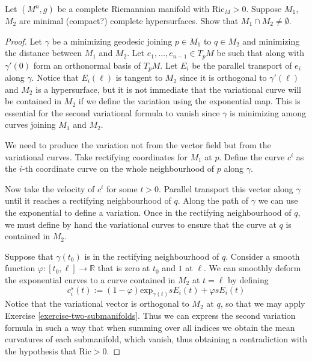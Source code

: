 \begin{exercise}
\label{exercise-inter-minim-hyper}
Let $(M^n,g)$ be a complete Riemannian
manifold with $\text{Ric}_M>0$.
Suppose $M_1$, $M_2$ are minimal (compact?)
complete hypersurfaces. Show that
$M_1 \cap M_2 \neq \emptyset$.
\end{exercise}

\begin{proof}
Let $\gamma$ be a minimizing geodesic joining
$p \in M_1$ to $q\in M_2$ and
minimizing the distance between $M_1$ and
$M_2$. Let $e_1,\ldots,e_{n-1}\in
T_pM$ be such that along with $\gamma'(0)$
form an orthonormal basis of $T_pM$.
Let $E_i$ be the parallel transport of $e_i$
along $\gamma$. Notice that
$E_i(\ell)$ is tangent to $M_2$ since it is
orthogonal to $\gamma'(\ell)$ and
$M_2$ is a hypersurface, but it is not
immediate that the variational curve will
be contained in $M_2$ if we define the
variation using the exponential map. This
is essential for the second variational
formula to vanish since $\gamma$ is
minimizing among curves joining $M_1$ and
$M_2$.

We need to produce the variation not from the
vector field but from the
variational curves. Take rectifying
coordinates for $M_1$ at $p$. Define the
curve $c^i$ as the $i$-th coordinate curve on
the whole neighbourhood of $p$
along $\gamma$.

Now take the velocity of $c^i$ for some
$t>0$. Parallel transport this vector
along $\gamma$ until it reaches a rectifying
neighbourhood of $q$. Along the
path of $\gamma$ we can use the exponential
to define a variation. Once in the
rectifying neighbourhood of $q$, we must
define by hand the variational curves
to ensure that the curve at $q$ is contained
in $M_2$.

Suppose that $\gamma(t_0)$ is in the
rectifying neighbourhood of $q$. Consider a
smooth function $\varphi:[t_0,\ell]\to
\mathbb{R}$ that is zero at $t_0$ and $1$
at $\ell$. We can smoothly deform the
exponential curves to a curve contained in
$M_2$ at $t=\ell$ by defining
$$
c^s_i(t):=(1-\varphi)\text{exp}_{\gamma(t)}
sE_i(t)+\varphi
sE_i(t)
$$
Notice that the variational vector is
orthogonal to $M_2$ at $q$, so that we may
apply Exercise
\ref{exercise-two-submanifolds}. Thus we can
express the second
variation formula in such a way that when
summing over all indices we obtain the
mean curvatures of each submanifold, which
vanish, thus obtaining a
contradiction with the hypothesis that
$\text{Ric}>0$.
\end{proof}

